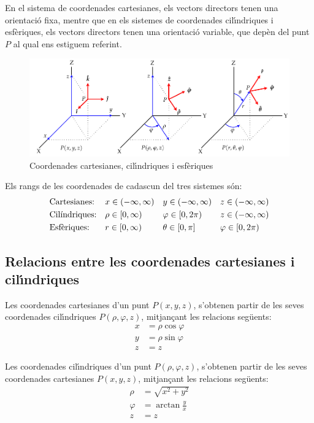 \documentclass[catalan,a4paper,twoside,11pt]{article}
\begin{document}
En el sistema de coordenades cartesianes, els vectors directors
tenen una orientaci\'{o} fixa, mentre que en els sistemes de
coordenades cil\'{\i}ndriques i esf\`{e}riques, els vectors
directors tenen una orientaci\'{o} variable, que dep\`{e}n del punt
$P$ al qual ens estiguem referint.
\begin{figure}[h]
\centering
   \includegraphics{Imatges/Coordenades.pdf}
\caption{Coordenades cartesianes, cil\'{\i}ndriques i esf\`{e}riques}
\label{pic:coord-cart-cil-esf}
\end{figure}

Els rangs de les coordenades de cadascun del tres sistemes s\'{o}n:
\begin{align}
    &\text{Cartesianes:} & & x\in(-\infty,\infty) & &
    y\in(-\infty,\infty) & & z\in(-\infty,\infty) \\
    &\text{Cil\'{\i}ndriques:} & & \rho\in[0,\infty) & &
    \varphi\in[0,2\pi) & & z\in(-\infty,\infty) \\
    &\text{Esf\`{e}riques:} & & r\in[0,\infty) & &
    \theta\in[0,\pi] & & \varphi\in[0,2\pi)
\end{align}

\subsection{Relacions entre les coordenades cartesianes i
cil\'{\i}ndriques}

Les coordenades cartesianes  d'un punt $P(x,y,z)$, s'obtenen partir
de les seves coordenades cil\'{\i}ndriques $P(\rho,\varphi,z)$,
mitjan\c{c}ant les relacions seg\"{u}ents:
\begin{subequations}\begin{align}
    x &=\rho\cos\varphi \\ y &=\rho\sin\varphi \\ z &=z
\end{align}\end{subequations}

Les coordenades  cil\'{\i}ndriques  d'un punt $P(\rho,\varphi,z)$,
s'obtenen partir de les seves coordenades cartesianes $P(x,y,z)$,
mitjan\c{c}ant les relacions seg\"{u}ents:
\begin{subequations}\begin{align}
    \rho &= \sqrt{x^2+y^2}\\
    \varphi &=  \arctan\frac{y}{x}\\
    z &= z
\end{align}\end{subequations}
\end{document}
